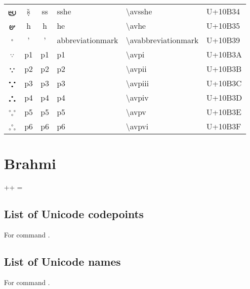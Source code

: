 {\begin{longtable}{ccclll}
{\avfont 𐬴 } &ṣ̌ &ss &sshe &\textbackslash avsshe &U+10B34 \\
{\avfont 𐬵 } &h &h &he &\textbackslash avhe &U+10B35 \\
{\avfont 𐬹 } &' &' &abbreviationmark &\textbackslash avabbreviationmark &U+10B39 \\
{\avfont 𐬺 } &p1 &p1 &p1 &\textbackslash avpi &U+10B3A \\
{\avfont 𐬻 } &p2 &p2 &p2 &\textbackslash avpii &U+10B3B \\
{\avfont 𐬼 } &p3 &p3 &p3 &\textbackslash avpiii &U+10B3C \\
{\avfont 𐬽 } &p4 &p4 &p4 &\textbackslash avpiv &U+10B3D \\
{\avfont 𐬾 } &p5 &p5 &p5 &\textbackslash avpv &U+10B3E \\
{\avfont 𐬿 } &p6 &p6 &p6 &\textbackslash avpvi &U+10B3F \\
\hline
\end{longtable}
}

\section{Brahmi}




++ = 


\subsection{List of Unicode codepoints}
For command \codedetok{\brtransuc{}}.
\begin{multicols}{4}\noindent
\brtag
\brshowplainlistuc
\eolist
\end{multicols}

\subsection{List of Unicode names}
For command \codedetok{\brtransun{}}.
\begin{multicols}{4}\noindent
\brtag
\brshowplainlistun
\eolist
\end{multicols}

